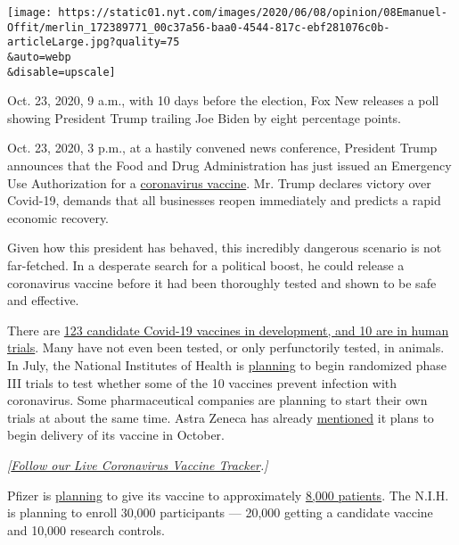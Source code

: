 \texttt{[image: https://static01.nyt.com/images/2020/06/08/opinion/08Emanuel-Offit/merlin\_172389771\_00c37a56-baa0-4544-817c-ebf281076c0b-articleLarge.jpg?quality=75\\\&auto=webp\\\&disable=upscale]}

Oct. 23, 2020, 9 a.m., with 10 days before the election, Fox New
releases a poll showing President Trump trailing Joe Biden by eight
percentage points.

Oct. 23, 2020, 3 p.m., at a hastily convened news conference, President
Trump announces that the Food and Drug Administration has just issued an
Emergency Use Authorization for a
\href{https://www.nytimes.com/interactive/2020/06/09/magazine/covid-vaccine.html}{coronavirus
vaccine}. Mr. Trump declares victory over Covid-19, demands that all
businesses reopen immediately and predicts a rapid economic recovery.

Given how this president has behaved, this incredibly dangerous scenario
is not far-fetched. In a desperate search for a political boost, he
could release a coronavirus vaccine before it had been thoroughly tested
and shown to be safe and effective.

There are
\href{https://www.who.int/who-documents-detail/draft-landscape-of-covid-19-candidate-vaccines}{123
candidate Covid-19 vaccines in development, and 10 are in human trials}.
Many have not even been tested, or only perfunctorily tested, in
animals. In July, the National Institutes of Health is
\href{https://www.nbcnews.com/health/health-news/nih-director-large-scale-vaccine-testing-should-be-ready-july-n1207751}{planning}
to begin randomized phase III trials to test whether some of the 10
vaccines prevent infection with coronavirus. Some pharmaceutical
companies are planning to start their own trials at about the same time.
Astra Zeneca has already
\href{https://www.astrazeneca.com/media-centre/press-releases/2020/astrazeneca-advances-response-to-global-covid-19-challenge-as-it-receives-first-commitments-for-oxfords-potential-new-vaccine.html}{mentioned}
it plans to begin delivery of its vaccine in October.

\emph{{[}}\href{https://www.nytimes.com/interactive/2020/science/coronavirus-vaccine-tracker.html}{\emph{Follow
our Live Coronavirus Vaccine Tracker}}\emph{.{]}}

Pfizer is
\href{https://www.cnbc.com/2020/05/05/pfizer-biontech-are-set-to-begin-us-coronavirus-vaccine-trial.html}{planning}
to give its vaccine to approximately
\href{https://www.cnbc.com/2020/05/05/pfizer-biontech-are-set-to-begin-us-coronavirus-vaccine-trial.html}{8,000
patients}. The N.I.H. is planning to enroll 30,000 participants ---
20,000 getting a candidate vaccine and 10,000 research controls.

